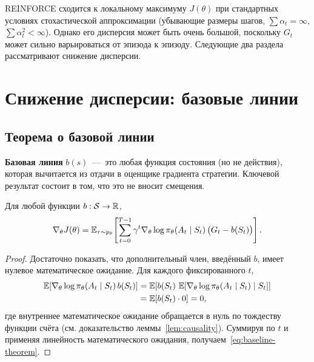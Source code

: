 \begin{remark}
REINFORCE сходится к локальному максимуму $J(\theta)$ при стандартных условиях стохастической аппроксимации (убывающие размеры шагов, $\sum \alpha_t = \infty$, $\sum \alpha_t^2 < \infty$). Однако его дисперсия может быть очень большой, поскольку $G_t$ может сильно варьироваться от эпизода к эпизоду. Следующие два раздела рассматривают снижение дисперсии.
\end{remark}

\section{Снижение дисперсии: базовые линии}
\label{sec:baselines}


\subsection{Теорема о базовой линии}

\textbf{Базовая линия} $b(s)$ \,---\, это любая функция состояния (но не действия), которая вычитается из отдачи в оценщике градиента стратегии. Ключевой результат состоит в том, что это не вносит смещения.

\begin{theorem}
\label{thm:baseline}
Для любой функции $b : \mathcal{S} \to \mathbb{R}$,
\begin{equation}
\label{eq:baseline-theorem}
\nabla_\theta J(\theta)
= \operatorname{\mathbb{E}}_{\tau \sim p_\theta}\!\left[\sum_{t=0}^{T-1} \gamma^t \nabla_\theta \log \pi_\theta(A_t \mid S_t)\, \bigl(G_t - b(S_t)\bigr)\right].
\end{equation}
\end{theorem}

\begin{proof}
Достаточно показать, что дополнительный член, введённый $b$, имеет нулевое математическое ожидание. Для каждого фиксированного $t$,
\begin{align*}
\operatorname{\mathbb{E}}\!\left[\nabla_\theta \log \pi_\theta(A_t \mid S_t)\, b(S_t)\right]
&= \operatorname{\mathbb{E}}\!\left[b(S_t)\, \operatorname{\mathbb{E}}\!\left[\nabla_\theta \log \pi_\theta(A_t \mid S_t) \mid S_t\right]\right] \\
&= \operatorname{\mathbb{E}}\!\left[b(S_t) \cdot 0\right] = 0,
\end{align*}
где внутреннее математическое ожидание обращается в нуль по тождеству функции счёта (см. доказательство леммы~\ref{lem:causality}). Суммируя по $t$ и применяя линейность математического ожидания, получаем~\eqref{eq:baseline-theorem}.
\end{proof}

